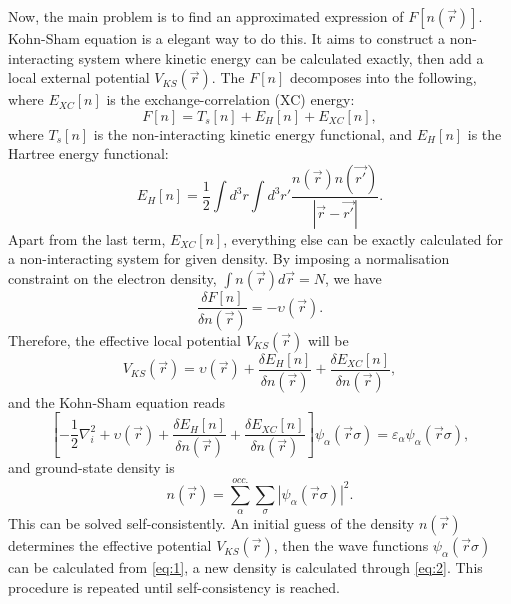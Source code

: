 Now, the main problem is to find an approximated expression of $F[n(\vec{r})]$. Kohn-Sham equation is a elegant way to do this. It aims to construct a non-interacting system where kinetic energy can be calculated exactly, then add a local external potential $V_{KS}(\vec{r})$. The $F[n]$ decomposes into the following, where $E_{XC}[n]$ is the exchange-correlation (XC) energy:
\begin{equation}
F[n]=T_s[n]+E_H[n]+E_{XC}[n],
\end{equation}
where $T_s[n]$ is the non-interacting kinetic energy functional, and $E_H[n]$ is the Hartree energy functional:
\begin{equation}
E_H[n]=\frac{1}{2}\int d^3r\int d^3r\prime\frac{n(\vec{r})n(\vec{r\prime})}{|\vec{r}-\vec{r\prime}|}.
\end{equation}
Apart from the last term, $E_{XC}[n]$, everything else can be exactly calculated for a non-interacting system for given density. By imposing a normalisation constraint on the electron density, $\int n(\vec{r})d\vec{r}=N$, we have
\begin{equation}
\frac{\delta F[n]}{\delta n(\vec{r})}=-\upsilon(\vec{r}).
\end{equation}
Therefore, the effective local potential $V_{KS}(\vec{r})$ will be
\begin{equation}
V_{KS}(\vec{r})=\upsilon(\vec{r})+\frac{\delta E_H[n]}{\delta n(\vec{r})}+\frac{\delta E_{XC}[n]}{\delta n(\vec{r})},
\end{equation}
and the Kohn-Sham equation reads
\begin{equation}\label{eq:1}
\left[ -\frac{1}{2}\nabla_i^2+\upsilon(\vec{r})+\frac{\delta E_H[n]}{\delta n(\vec{r})}+\frac{\delta E_{XC}[n]}{\delta n(\vec{r})}\right]\mathit{\psi}_\alpha(\vec{r}\sigma)=\varepsilon_\alpha\mathit{\psi}_\alpha(\vec{r}\sigma),
\end{equation}
and ground-state density is 
\begin{equation}\label{eq:2}
n(\vec{r})=\sum_\alpha^{occ.}\sum_\sigma|\mathit{\psi}_\alpha(\vec{r}\sigma)|^2.
\end{equation}
This can be solved self-consistently. An initial guess of the density $n(\vec{r})$ determines the effective potential $V_{KS}(\vec{r})$, then the wave functions $\mathit{\psi}_\alpha(\vec{r}\sigma)$ can be calculated from \autoref{eq:1}, a new density is calculated through \autoref{eq:2}. This procedure is repeated until self-consistency is reached. 
